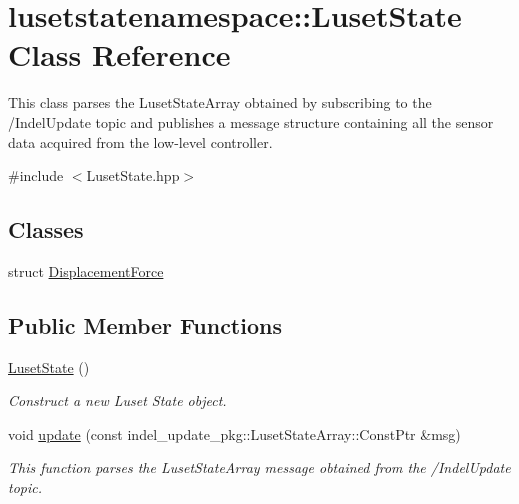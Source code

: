 \hypertarget{classlusetstatenamespace_1_1LusetState}{}\section{lusetstatenamespace\+:\+:Luset\+State Class Reference}
\label{classlusetstatenamespace_1_1LusetState}


This class parses the Luset\+State\+Array obtained by subscribing to the /\+Indel\+Update topic and publishes a message structure containing all the sensor data acquired from the low-\/level controller.  




{\ttfamily \#include $<$Luset\+State.\+hpp$>$}

\subsection*{Classes}
\begin{DoxyCompactItemize}
\item 
struct \hyperlink{structlusetstatenamespace_1_1LusetState_1_1DisplacementForce}{Displacement\+Force}
\end{DoxyCompactItemize}
\subsection*{Public Member Functions}
\begin{DoxyCompactItemize}
\item 
\hyperlink{classlusetstatenamespace_1_1LusetState_a56014a12eb93b94767ff6100eae715f1}{Luset\+State} ()
\begin{DoxyCompactList}\small\item\em Construct a new Luset State object. \end{DoxyCompactList}\item 
void \hyperlink{classlusetstatenamespace_1_1LusetState_a47cade12b97053f9c4432cc629300299}{update} (const indel\+\_\+update\+\_\+pkg\+::\+Luset\+State\+Array\+::\+Const\+Ptr \&msg)
\begin{DoxyCompactList}\small\item\em This function parses the Luset\+State\+Array message obtained from the /\+Indel\+Update topic. \end{DoxyCompactList}\end{DoxyCompactItemize}
